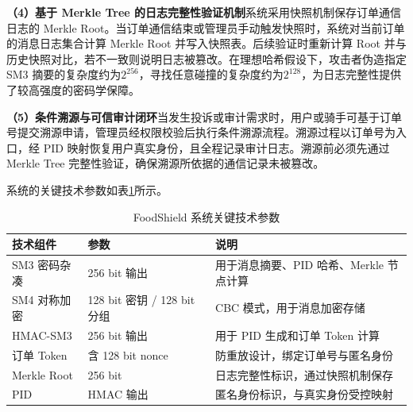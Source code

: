 \textbf{（4）基于 Merkle Tree 的日志完整性验证机制}\quad 系统采用快照机制保存订单通信日志的 Merkle Root。当订单通信结束或管理员手动触发快照时，系统对当前订单的消息日志集合计算 Merkle Root 并写入快照表。后续验证时重新计算 Root 并与历史快照对比，若不一致则说明日志被篡改。在理想哈希假设下，攻击者伪造指定 SM3 摘要的复杂度约为$2^{256}$，寻找任意碰撞的复杂度约为$2^{128}$，为日志完整性提供了较高强度的密码学保障。

\textbf{（5）条件溯源与可信审计闭环}\quad 当发生投诉或审计需求时，用户或骑手可基于订单号提交溯源申请，管理员经权限校验后执行条件溯源流程。溯源过程以订单号为入口，经 PID 映射恢复用户真实身份，且全程记录审计日志。溯源前必须先通过 Merkle Tree 完整性验证，确保溯源所依据的通信记录未被篡改。

系统的关键技术参数如表\ref{tab:tech-params}所示。

\begin{table}[H]
\centering
\caption{FoodShield 系统关键技术参数}
\label{tab:tech-params}
\begin{tabular}{llp{7cm}}
\toprule
技术组件 & 参数 & 说明 \\
\midrule
SM3 密码杂凑 & 256 bit 输出 & 用于消息摘要、PID 哈希、Merkle 节点计算 \\
SM4 对称加密 & 128 bit 密钥 / 128 bit 分组 & CBC 模式，用于消息加密存储 \\
HMAC-SM3 & 256 bit 输出 & 用于 PID 生成和订单 Token 计算 \\
订单 Token & 含 128 bit nonce & 防重放设计，绑定订单号与匿名身份 \\
Merkle Root & 256 bit & 日志完整性标识，通过快照机制保存 \\
PID & HMAC 输出 & 匿名身份标识，与真实身份受控映射 \\
\bottomrule
\end{tabular}
\end{table}
